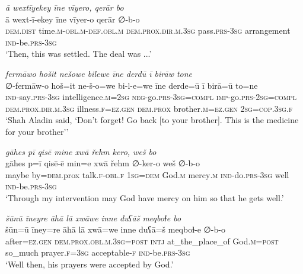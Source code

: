 \ea \label{DG.55}
\textit{ā wextīyekey īne vīyero, qerār bo} \\ 
\gll ā wext-ī-ekey īne vīyer-o qerār ∅-b-o \\ 
 \textsc{dem.dist} time\textsc{.m}\textsc{-obl}\textsc{.m}\textsc{-def}\textsc{.obl}\textsc{.m} \textsc{dem.prox}\textsc{.dir}\textsc{.m}\textsc{.3sg} pass\textsc{.prs}\textsc{-3sg} arrangement \textsc{ind-}be\textsc{.prs}\textsc{-3sg} \\ 
\glt `Then, this was settled. The deal was ...'
\z 
 
\ea \label{DG.56}
\textit{fermāwo hošit nešowe bilewe īne derdū ī birāw tone} \\ 
\gll ∅-fermāw-o hoš=it ne-š-o=we bi-l-e=we īne derde=ū ī birā=ū to=ne \\ 
 \textsc{ind-}say\textsc{.prs}\textsc{-3sg} intelligence\textsc{.m}\textsc{=\textsc{2sg}} \textsc{neg-}go\textsc{.prs}\textsc{-3sg}\textsc{=\textsc{compl}} \textsc{imp-}go\textsc{.prs}-\textsc{2sg}\textsc{=compl} \textsc{dem.prox}\textsc{.dir}\textsc{.m}\textsc{.3sg} illness\textsc{\textsc{.f}}\textsc{=ez}\textsc{.gen} \textsc{dem.prox} brother\textsc{.m}\textsc{=ez}\textsc{.gen} \textsc{2sg}\textsc{=cop}\textsc{.3sg}\textsc{\textsc{.f}} \\ 
\glt `Shah Aladin said, ‘Don’t forget! Go back [to your brother]. This is the medicine for your brother’'
\z 
 
\ea \label{DG.59}
\textit{gāhes pī qisē mine xwā řehm kero, weš bo} \\ 
\gll gāhes p=ī qisē-ē min=e xwā řehm ∅-ker-o weš ∅-b-o \\ 
 maybe by\textsc{=dem}.prox talk\textsc{\textsc{.f}}\textsc{-obl}\textsc{\textsc{.f}} \textsc{1sg}\textsc{=dem} God\textsc{.m} mercy\textsc{.m} \textsc{ind-}do\textsc{.prs}\textsc{-3sg} well \textsc{ind-}be\textsc{.prs}\textsc{-3sg} \\ 
\glt `Through my intervention may God have mercy on him so that he gets well.'
\z 
 
\ea \label{DG.60}
\textit{šūnū īneyre āhā lā xwāwe inne duʕāš meqboɫe bo} \\ 
\gll šūn=ū īney=re āhā lā xwā=we inne duʕā=š meqboɫ-e ∅-b-o \\ 
 after\textsc{=ez}\textsc{.gen} \textsc{dem.prox}\textsc{.obl}\textsc{.m}\textsc{.3sg}\textsc{=\textsc{post}} \textsc{intj} at\_the\_place\_of God\textsc{.m}\textsc{=\textsc{post}} so\_much prayer\textsc{\textsc{.f}}\textsc{=3sg} acceptable\textsc{-f} \textsc{ind-}be\textsc{.prs}\textsc{-3sg} \\ 
\glt `Well then, his prayers were accepted by God.'
\z 
 
